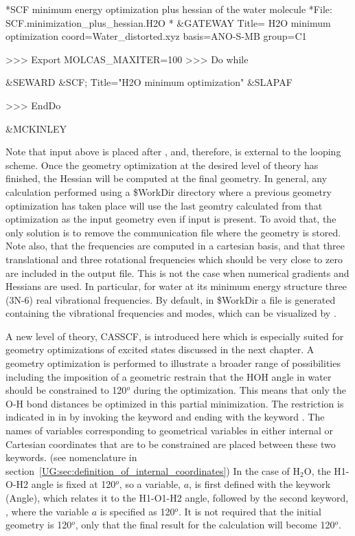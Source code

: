 \begin{inputlisting}
*SCF minimum energy optimization plus hessian of the water molecule
*File: SCF.minimization_plus_hessian.H2O
*
&GATEWAY 
 Title= H2O minimum optimization
 coord=Water_distorted.xyz
 basis=ANO-S-MB
 group=C1

>>> Export MOLCAS_MAXITER=100
>>> Do while

 &SEWARD
 &SCF; Title="H2O minimum optimization"
 &SLAPAF

>>> EndDo

&MCKINLEY
\end{inputlisting}

Note that  input above is placed after , and, therefore,
is external to the looping scheme. Once the geometry optimization at the desired level of theory has finished, the 
Hessian will be computed at the final geometry.
In general, any calculation performed using a \$WorkDir directory where a 
previous geometry optimization has taken place will use the last geomtry calculated 
from that optimization as the input geometry even if  input is 
present. To avoid that, the only solution is to remove the communication file 
 where the geometry is stored. Note also, that the frequencies are 
computed in a cartesian basis, and that three translational and three rotational 
frequencies which should be very close to zero are included in the output file.
This is not the case when numerical gradients and Hessians are used. 
In particular, for water at its minimum energy structure three (3N-6) 
real vibrational frequencies. By default, in \$WorkDir a file 
is generated containing the vibrational frequencies and modes, which can be visualized by .

A new level of theory, CASSCF, is introduced here which is especially suited for 
geometry optimizations of excited states discussed in the next chapter.
A geometry optimization is performed to illustrate a broader range of possibilities including 
the imposition of a geometric restrain that the HOH angle in water should be constrained to 120$^o$
during the optimization.
This means that only the O-H bond distances be optimized in this partial minimization. 
The restriction is indicated
in in 
by invoking the keyword  and ending with the keyword . 
The names of variables corresponding to geometrical variables in either internal or Cartesian coordinates
that are to be constrained are placed between these two keywords. 
\ifmanual
(see nomenclature in 
section~\ref{UG:sec:definition_of_internal_coordinates})
\fi
In the case of H$_2$O, the H1-O-H2 angle is fixed at 120$^o$, so a variable,
$a$, is first defined with the keywork \keyword(Angle), which relates it to the H1-O1-H2 angle, followed by the second keyword, , 
where the variable $a$ is specified as 120$^o$. 
It is not required that the initial geometry is 120$^o$, only that the final result for the calculation
will become 120$^o$.

